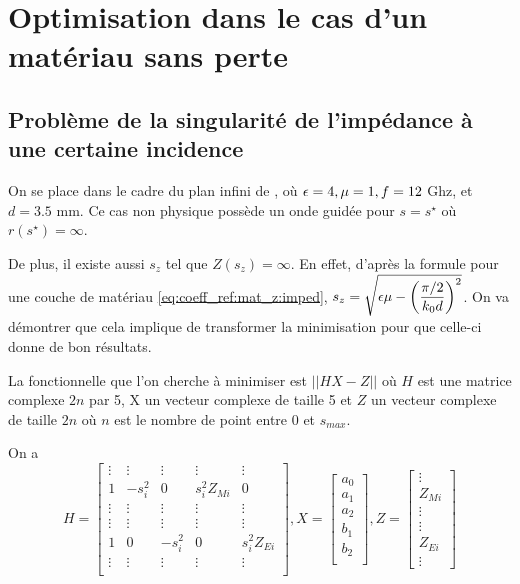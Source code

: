 \section{Optimisation dans le cas d'un matériau sans perte}

\subsection{Problème de la singularité de l'impédance à une certaine incidence}
On se place dans le cadre du plan infini de \cite{soudais_3d_2017}, où $\epsilon=4,\mu=1,f=12$ Ghz, et $d=3.5$ mm. Ce cas non physique possède un onde guidée pour $s=s^\star$ où $r(s^\star) = \infty$. 

De plus, il existe aussi $s_z$ tel que $Z(s_z) = \infty$. En effet, d'après la formule pour une couche de matériau \eqref{eq:coeff_ref:mat_z:imped}, $s_z = \sqrt{\epsilon \mu - \left(\dfrac{\pi/2}{k_0 d}\right)^2}$. On va démontrer que cela implique de transformer la minimisation pour que celle-ci donne de bon résultats.

La fonctionnelle que l'on cherche à minimiser est $||H X - Z||$ où $H$ est une matrice complexe $2n$ par 5, X un vecteur complexe de taille 5 et $Z$ un vecteur complexe de taille $2n$ où $n$ est le nombre de point entre 0 et $s_{max}$. 


On a 
\[
  H = \begin{bmatrix}
  \vdots & \vdots & \vdots & \vdots &\vdots \\
  1 & -s_i^2 & 0 & s_i^2 Z_{Mi} & 0 \\
  \vdots & \vdots & \vdots & \vdots &\vdots \\
  \vdots & \vdots & \vdots & \vdots &\vdots \\
  1 & 0 &-s_i^2 & 0 & s_i^2 Z_{Ei} \\
  \vdots & \vdots & \vdots & \vdots &\vdots \\
  \end{bmatrix},
  X = \begin{bmatrix}
  a_0\\
  a_1\\
  a_2\\
  b_1\\
  b_2\\
  \end{bmatrix},
  Z=\begin{bmatrix}
  \vdots\\
  Z_{Mi}\\
  \vdots\\
  \vdots\\
  Z_{Ei}\\
  \vdots
  \end{bmatrix}
\]

